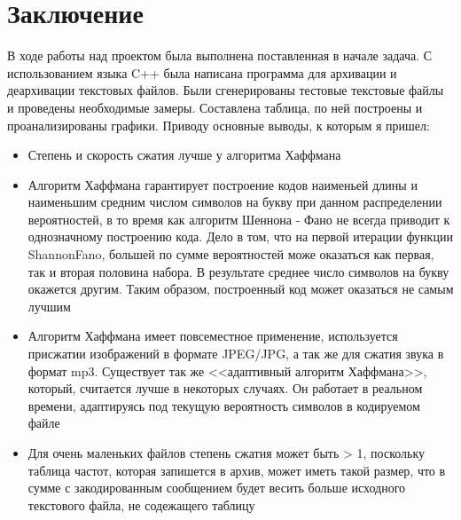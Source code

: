 \documentclass[russian, a4paper, 12pt]{article}
\begin{document}
\section{Заключение}
В ходе работы над проектом была выполнена поставленная в начале задача. С использованием
языка C++ была написана программа для архивации и деархивации текстовых файлов. Были сгенерированы
тестовые текстовые файлы и проведены необходимые замеры. Составлена таблица, по ней построены
и проанализированы графики. Приводу основные выводы, к которым я пришел:
\begin{itemize}
  \item Степень и скорость сжатия лучше у алгоритма Хаффмана
  \item Алгоритм Хаффмана гарантирует построение кодов наименьей длины и наименьшим средним числом символов
  на букву при данном распределении вероятностей, в то время как алгоритм
  Шеннона - Фано не всегда приводит к однозначному построению кода.
  Дело в том, что на первой итерации функции ShannonFano, большей по сумме вероятностей
  може оказаться как первая, так и вторая половина набора. В результате среднее число
  символов на букву окажется другим. Таким образом, построенный код может оказаться не самым лучшим
  \item Алгоритм Хаффмана имеет повсеместное применение, используется присжатии изображений в формате JPEG/JPG,
  а так же для сжатия звука в формат mp3. Существует так же <<адаптивный алгоритм Хаффмана>>, который,
  считается лучше в некоторых случаях. Он работает в реальном времени, адаптируясь под текущую
  вероятность символов в кодируемом файле
  \item Для очень маленьких файлов степень сжатия может быть > 1, поскольку таблица частот,
  которая запишется в архив, может иметь такой размер, что в сумме с закодированным сообщением будет
  весить больше исходного текстового файла, не содежащего таблицу
\end{itemize}
\end{document}
